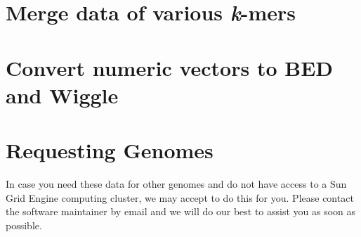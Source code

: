 \documentclass[letterpaper,10pt,english]{sphinxmanual}
\begin{document}
\chapter{Merge data of various \emph{k}-mers}
\label{documentation:merge-data-of-various-k-mers}

\begin{fulllineitems}
\label{documentation:umap.CombineUmaps}
\end{fulllineitems}



\chapter{Convert numeric vectors to BED and Wiggle}
\label{documentation:convert-numeric-vectors-to-bed-and-wiggle}

\begin{fulllineitems}
\label{documentation:umap.Int8Handler}
\end{fulllineitems}


\begin{fulllineitems}
\label{documentation:umap.Int8Handler.write_beds}
\end{fulllineitems}


\begin{fulllineitems}
\label{documentation:umap.Int8Handler.write_as_wig}
\end{fulllineitems}



\chapter{Requesting Genomes}
\label{documentation:requesting-genomes}
In case you need these data for other genomes and do not have access to a Sun Grid Engine computing cluster,
we may accept to do this for you.
Please contact the software maintainer by email and we will do our best to assist you as soon as possible.
\end{document}
